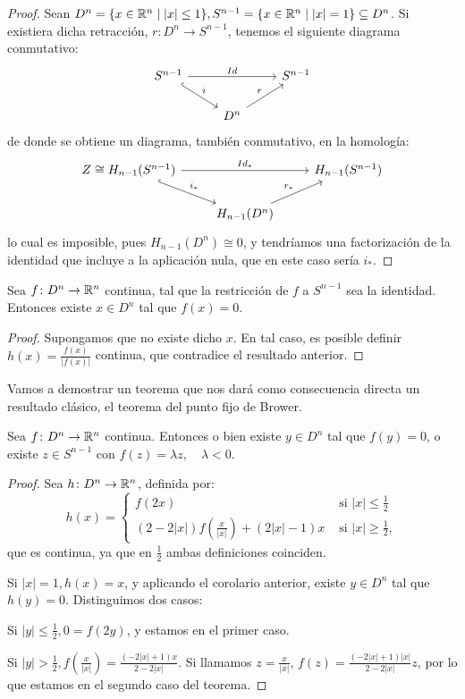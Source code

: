 \begin{proof}
  Sean $D^n = \{x \in \mathbb{R}^n \mid |x| \leq 1\}, S^{n-1} = \{x \in \mathbb{R}^n \mid |x| = 1\} \subseteq D^n$. Si existiera dicha retracción,
  $r \colon D^n \to S^{n-1}$, tenemos el siguiente diagrama conmutativo:
  \[ \begin{tikzcd}
    S^{n-1} \arrow[hookrightarrow]{dr}{i} \arrow{rr}{Id} & & S^{n-1} \\
    & D^n \arrow{ur}{r}
  \end{tikzcd} \]
  de donde se obtiene un diagrama, también conmutativo, en la homología:
  \[ \begin{tikzcd}
    Z \cong H_{n-1}(S^{n-1}) \arrow[hookrightarrow]{dr}{i_*} \arrow{rr}{Id_*} & & H_{n-1}(S^{n-1}) \\
    & H_{n-1}(D^n) \arrow{ur}{r_*}
  \end{tikzcd} \]
  lo cual es imposible, pues $H_{n-1}(D^n) \cong 0$, y tendríamos una factorización de la identidad que incluye a la aplicación nula,
  que en este caso sería $i_*$.
\end{proof}

\begin{corollary}
  Sea $f \colon D^n \to \mathbb{R}^n$ continua, tal que la restricción de $f$ a $S^{n-1}$ sea la identidad.
  Entonces existe $x \in D^n$ tal que $f(x) = 0$.
\end{corollary}

\begin{proof}
  Supongamos que no existe dicho $x$. En tal caso, es posible definir $h(x) = \frac{f(x)}{|f(x)|}$
  continua, que contradice el resultado anterior.
\end{proof}

Vamos a demostrar un teorema que nos dará como consecuencia directa un resultado clásico, el teorema
del punto fijo de Brower.

\begin{theorem}
  Sea $f \colon D^n \to \mathbb{R}^n$ continua. Entonces o bien existe $y \in D^n$ tal que $f(y) = 0$, o existe
  $z \in S^{n-1}$ con $f(z) = \lambda z, \quad \lambda < 0$.
\end{theorem}

\begin{proof}
  Sea $h \colon D^n \to \mathbb{R}^n$, definida por:
  \[ h(x) = \begin{cases} f(2x) &\text{ si } |x| \leq \frac{1}{2} \\
                          (2-2|x|)f(\frac{x}{|x|}) + (2|x| - 1)x &\text{ si } |x| \geq \frac{1}{2}, \end{cases} \]
  que es continua, ya que en $\frac{1}{2}$ ambas definiciones coinciden.

  Si $|x| = 1, h(x) = x$, y aplicando el corolario anterior, existe $y \in D^n$ tal que $h(y) = 0$. Distinguimos dos casos:

  Si $|y| \leq \frac{1}{2}, 0 = f(2y)$, y estamos en el primer caso.

  Si $|y| > \frac{1}{2}, f(\frac{x}{|x|}) = \frac{(-2|x| + 1)x}{2-2|x|}$. Si llamamos $z = \frac{x}{|x|}$,
  $f(z) = \frac{(-2|x|+1)|x|}{2-2|x|} z$, por lo que estamos en el segundo caso del teorema.
\end{proof}

